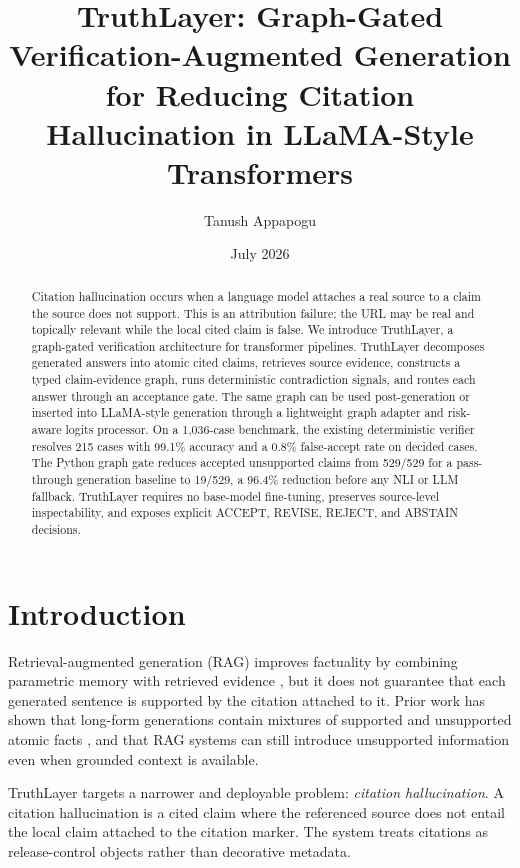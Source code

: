 \documentclass[11pt]{article}
\title{TruthLayer: Graph-Gated Verification-Augmented Generation for Reducing Citation Hallucination in LLaMA-Style Transformers}
\author{Tanush Appapogu}
\date{July 2026}
\begin{document}
\maketitle

\begin{abstract}
Citation hallucination occurs when a language model attaches a real source to a claim the source does not support. This is an attribution failure: the URL may be real and topically relevant while the local cited claim is false. We introduce TruthLayer, a graph-gated verification architecture for transformer pipelines. TruthLayer decomposes generated answers into atomic cited claims, retrieves source evidence, constructs a typed claim-evidence graph, runs deterministic contradiction signals, and routes each answer through an acceptance gate. The same graph can be used post-generation or inserted into LLaMA-style generation through a lightweight graph adapter and risk-aware logits processor. On a 1,036-case benchmark, the existing deterministic verifier resolves 215 cases with 99.1\% accuracy and a 0.8\% false-accept rate on decided cases. The Python graph gate reduces accepted unsupported claims from 529/529 for a pass-through generation baseline to 19/529, a 96.4\% reduction before any NLI or LLM fallback. TruthLayer requires no base-model fine-tuning, preserves source-level inspectability, and exposes explicit ACCEPT, REVISE, REJECT, and ABSTAIN decisions.
\end{abstract}

\section{Introduction}
Retrieval-augmented generation (RAG) improves factuality by combining parametric memory with retrieved evidence \cite{lewis2020rag}, but it does not guarantee that each generated sentence is supported by the citation attached to it. Prior work has shown that long-form generations contain mixtures of supported and unsupported atomic facts \cite{min2023factscore}, and that RAG systems can still introduce unsupported information even when grounded context is available.

TruthLayer targets a narrower and deployable problem: \emph{citation hallucination}. A citation hallucination is a cited claim where the referenced source does not entail the local claim attached to the citation marker. The system treats citations as release-control objects rather than decorative metadata.
\end{document}
